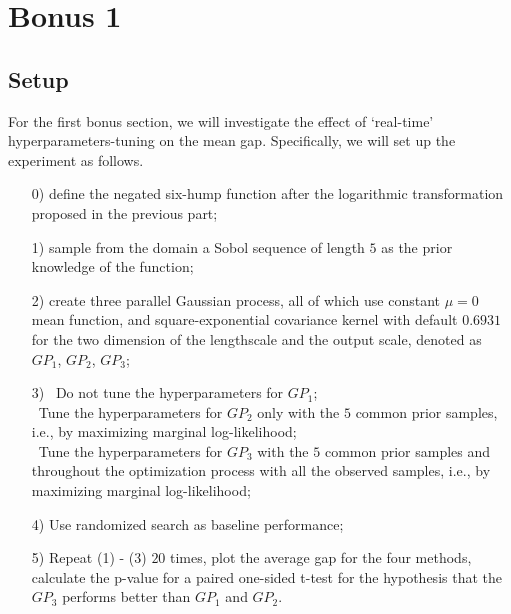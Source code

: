 \documentclass[12pt,a4paper]{article}
\begin{document}
\newpage
\section{Bonus 1}
\subsection{Setup}
For the first bonus section, we will investigate the effect of `real-time' hyperparameters-tuning on the mean gap. Specifically, we will set up the experiment as follows.

\begin{itemize}
	\item[0)] define the negated six-hump function after the logarithmic transformation proposed in the previous part;
	\item[1)] sample from the domain a Sobol sequence of length $5$ as the prior knowledge of the function;
	\item[2)] create three parallel Gaussian process, all of which use constant $\mu=0$ mean function, and square-exponential covariance kernel with default $0.6931$ for the two dimension of the lengthscale and the output scale, denoted as $GP_1$, $GP_2$, $GP_3$;
	\item[3)] 
	\textbullet\ Do not tune the hyperparameters for $GP_1$;\\
	\textbullet\ Tune the hyperparameters for $GP_2$ only with the $5$ common prior samples, i.e., by maximizing marginal log-likelihood;\\
	\textbullet\ Tune the hyperparameters for $GP_3$ with the $5$ common prior samples and throughout the optimization process with all the observed samples, i.e., by maximizing marginal log-likelihood;
	\item[4)] Use randomized search as baseline performance;
	\item[5)] Repeat (1) - (3) $20$ times, plot the average gap for the four methods, calculate the p-value for a paired one-sided t-test for the hypothesis that the $GP_3$ performs better than $GP_1$ and $GP_2$.  
\end{itemize}
\end{document}
